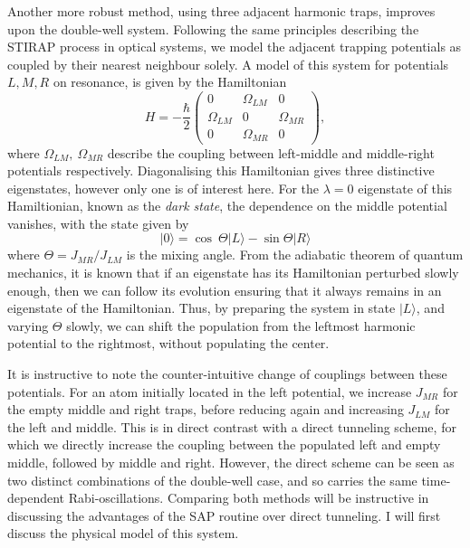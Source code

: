 Another more robust method, using three adjacent harmonic traps, improves upon the double-well system. Following the same principles describing the STIRAP process in optical systems, we model the adjacent trapping potentials as coupled by their nearest neighbour solely. A model of this system for potentials $L,M,R$ on resonance, is given by the Hamiltonian
\begin{equation}\label{eqn:sap_ham}
    H = -\frac{\hbar}{2}
    \begin{pmatrix}
        0 & \Omega_{LM} & 0 \\
        \Omega_{LM} & 0 & \Omega_{MR} \\
        0 & \Omega_{MR} & 0
    \end{pmatrix},
\end{equation}
where $\Omega_{LM},~\Omega_{MR}$ describe the coupling between left-middle and middle-right potentials respectively. Diagonalising this Hamiltonian gives three distinctive eigenstates, however only one is of interest here. For the $\lambda=0$ eigenstate of this Hamiltionian, known as the \textit{dark state}, the dependence on the middle potential vanishes, with the state given by
\begin{equation}
 | 0 \rangle = \cos\ \Theta| L \rangle - \sin \Theta | R \rangle
\end{equation}
where $\Theta=J_{MR}/J_{LM}$ is the mixing angle. From the adiabatic theorem of quantum mechanics, it is known that if an eigenstate has its Hamiltonian perturbed slowly enough, then we can follow its evolution ensuring that it always remains in an eigenstate of the Hamiltonian. Thus, by preparing the system in state $| L \rangle$, and varying $\Theta$ slowly, we can shift the population from the leftmost harmonic potential to the rightmost, without populating the center.

It is instructive to note the counter-intuitive change of couplings between these potentials. For an atom initially located in the left potential, we increase $J_{MR}$ for the empty middle and right traps, before reducing again and increasing $J_{LM}$ for the left and middle. This is in direct contrast with a direct tunneling scheme, for which we directly increase the coupling between the populated left and empty middle, followed by middle and right. However, the direct scheme can be seen as two distinct combinations of the double-well case, and so carries the same time-dependent Rabi-oscillations. Comparing both methods will be instructive in discussing the advantages of the SAP routine over direct tunneling. I will first discuss the physical model of this system.

